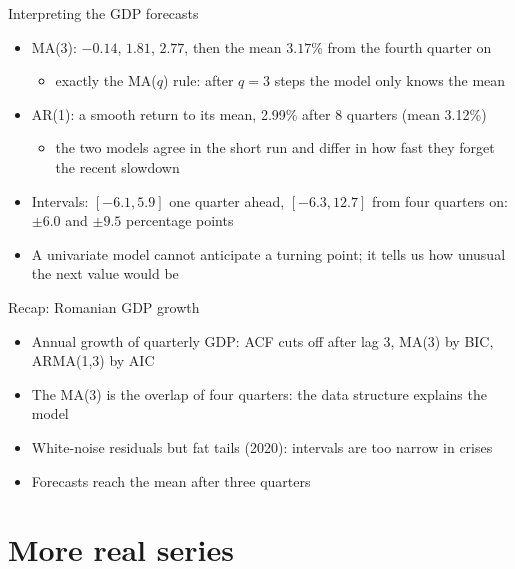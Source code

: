 \begin{frame}{Interpreting the GDP forecasts}
\itemsize{\small}
\begin{itemize}
    \item MA(3): $\ensuremath{-}0.14$, $1.81$, $2.77$, then the mean $3.17$\% from the fourth quarter on
    \begin{itemize}
        \item exactly the MA($q$) rule: after $q = 3$ steps the model only knows the mean
    \end{itemize}
    \item AR(1): a smooth return to its mean, 2.99\% after 8 quarters (mean 3.12\%)
    \begin{itemize}
        \item the two models agree in the short run and differ in how fast they forget the recent slowdown
    \end{itemize}
    \item Intervals: $[\ensuremath{-}6.1, 5.9]$ one quarter ahead, $[\ensuremath{-}6.3, 12.7]$ from four quarters on: $\pm 6.0$ and $\pm 9.5$ percentage points
    \item A univariate model cannot anticipate a turning point; it tells us how unusual the next value would be
\end{itemize}
\end{frame}

\begin{frame}{Recap: Romanian GDP growth}
\itemsize{\small}
\begin{itemize}
    \item Annual growth of quarterly GDP: ACF cuts off after lag 3, MA(3) by BIC, ARMA(1,3) by AIC
    \item The MA(3) is the overlap of four quarters: the data structure explains the model
    \item White-noise residuals but fat tails (2020): intervals are too narrow in crises
    \item Forecasts reach the mean after three quarters
\end{itemize}
\end{frame}


\section{More real series}

